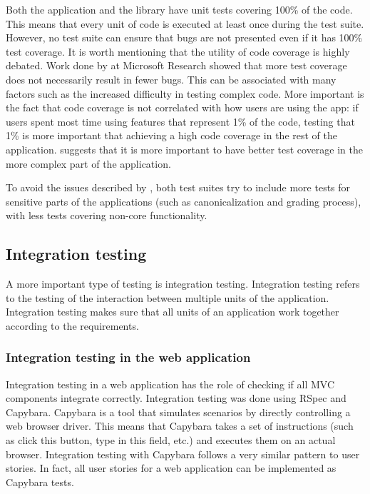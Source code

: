 Both the application and the library have unit tests covering 100\% of the code. This means that every unit of code is executed at least once during the test suite. However, no test suite can ensure that bugs are not presented even if it has 100\% test coverage. It is worth mentioning that the utility of code coverage is highly debated. Work done by \cite{msft_testing} at Microsoft Research showed that more test coverage does not necessarily result in fewer bugs. This can be associated with many factors such as the increased difficulty in testing complex code. More important is the fact that code coverage is not correlated with how users are using the app: if users spent most time using features that represent 1\% of the code, testing that 1\% is more important that achieving a high code coverage in the rest of the application. \cite{msft_testing} suggests that it is more important to have better test coverage in the more complex part of the application.

To avoid the issues described by \cite{msft_testing}, both test suites try to include more tests for sensitive parts of the applications (such as canonicalization and grading process), with less tests covering non-core functionality.

\subsection{Integration testing}

A more important type of testing is integration testing. Integration testing refers to the testing of the interaction between multiple units of the application. Integration testing makes sure that all units of an application work together according to the requirements.

\subsubsection{Integration testing in the web application}

Integration testing in a web application has the role of checking if all MVC components integrate correctly. Integration testing was done using RSpec and Capybara. Capybara is a tool that simulates scenarios by directly controlling a web browser driver. This means that Capybara takes a set of instructions (such as click this button, type in this field, etc.) and executes them on an actual browser. Integration testing with Capybara follows a very similar pattern to user stories. In fact, all user stories for a web application can be implemented as Capybara tests.

